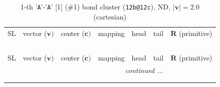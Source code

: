 \documentclass[fleqn,10pt,landscape]{jsarticle}
\begin{document}
\renewcommand{\arraystretch}{1.6}
\begin{longtable}[l]{cllllll}
\captionsetup{justification=raggedright, singlelinecheck=off}
\caption{1-th '\texttt{A}'-'\texttt{A}' [1] (\#1) bond cluster (\texttt{12b@12c}), ND, $|\bm{v}|=2.0$ (cartesian)}
 \\
 \hline \hline
SL & vector ($\bm{v})$ & center ($\bm{c})$ & mapping & head & tail & $\bm{R}$ (primitive) \\ \hline \endfirsthead

\multicolumn{6}{l}{\tablename\ \thetable{}} \\
 \hline \hline
SL & vector ($\bm{v})$ & center ($\bm{c})$ & mapping & head & tail & $\bm{R}$ (primitive) \\ \hline \endhead

 \hline \hline
\multicolumn{6}{r}{\footnotesize\it continued ...} \\ \endfoot

 \hline \hline
\multicolumn{6}{r}{} \\ \endlastfoot


\end{longtable}
\end{document}
